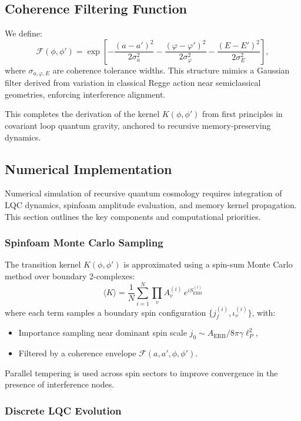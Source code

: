 \subsection*{Coherence Filtering Function}

We define:
\[
\mathcal{F}(\phi, \phi') = \exp\left[-\frac{(a - a')^2}{2\sigma_a^2} - \frac{(\varphi - \varphi')^2}{2\sigma_\varphi^2} - \frac{(E - E')^2}{2\sigma_E^2}\right],
\]
where \(\sigma_{a,\varphi,E}\) are coherence tolerance widths. This structure mimics a Gaussian filter derived from variation in classical Regge action near semiclassical geometries, enforcing interference alignment.

This completes the derivation of the kernel \( K(\phi, \phi') \) from first principles in covariant loop quantum gravity, anchored to recursive memory-preserving dynamics.
\subsection*{Numerical Implementation}
\label{appendix:C5}

Numerical simulation of recursive quantum cosmology requires integration of LQC dynamics, spinfoam amplitude evaluation, and memory kernel propagation. This section outlines the key components and computational priorities.

\subsubsection*{Spinfoam Monte Carlo Sampling}

The transition kernel \( K(\phi, \phi') \) is approximated using a spin-sum Monte Carlo method over boundary 2-complexes:
\begin{equation}
\langle K \rangle = \frac{1}{N} \sum_{i=1}^N \prod_v A_v^{(i)} \, e^{i S_{\text{ERB}}^{(i)}}
\end{equation}
where each term samples a boundary spin configuration \( \{j_f^{(i)}, \iota_v^{(i)}\} \), with:
\begin{itemize}
  \item Importance sampling near dominant spin scale \( j_0 \sim A_{\text{ERB}}/8\pi\gamma\ell_P^2 \),
  \item Filtered by a coherence envelope \( \mathcal{F}(a, a', \phi, \phi') \).
\end{itemize}
Parallel tempering is used across spin sectors to improve convergence in the presence of interference nodes.

\subsubsection*{Discrete LQC Evolution}

